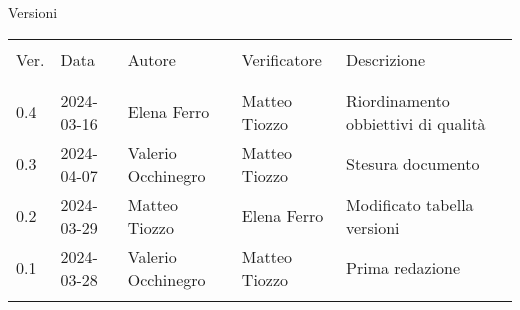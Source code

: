 \documentclass[italian,12pt]{article} %
\begin{document}

\newpage

\captionsetup[table]{list=no}
\begin{table}[!h]
	\begin{center}
		Versioni\\
		\vspace{0.5cm}
		\begin{tabular}{ l l l l l }
			\hline                                                                                       \\[-2ex]
			Ver. & Data       & Autore             & Verificatore  & Descrizione                         \\
			\\[-2ex] \hline \\[-1.5ex]
			0.4  & 2024-03-16 & Elena Ferro        & Matteo Tiozzo & Riordinamento obbiettivi di qualità \\
			0.3  & 2024-04-07 & Valerio Occhinegro & Matteo Tiozzo & Stesura documento                   \\
			0.2  & 2024-03-29 & Matteo Tiozzo      & Elena Ferro   & Modificato tabella versioni         \\
			0.1  & 2024-03-28 & Valerio Occhinegro & Matteo Tiozzo & Prima redazione                     \\
			\\[-1.5ex] \hline
		\end{tabular}
	\end{center}
\end{table}
\captionsetup[table]{list=yes}
\newpage
\tableofcontents
\listoftables
\listoffigures
\newpage





\end{document}
